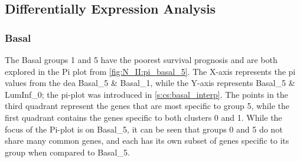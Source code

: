 




\subsection{Differentially Expression Analysis} \label{s:N_II:dea_rwd}

\subsubsection*{Basal} \label{s:N_II:basak}

The Basal groups 1 and 5 have the poorest survival prognosis and are both explored in the Pi plot from \cref{fig:N_II:pi_basal_5}. The X-axis represents the pi values from the \acrfull{dea} Basal\_5 \& Basal\_1, while the Y-axis represents Basal\_5 \& LumInf\_0; the pi-plot was introduced in \cref{s:cs:basal_interp}. The points in the third quadrant represent the genes that are most specific to group 5, while the first quadrant contains the genes specific to both clusters 0 and 1. While the focus of the Pi-plot is on Basal\_5, it can be seen that groups 0 and 5 do not share many common genes, and each has its own subset of genes specific to its group when compared to Basal\_5.

